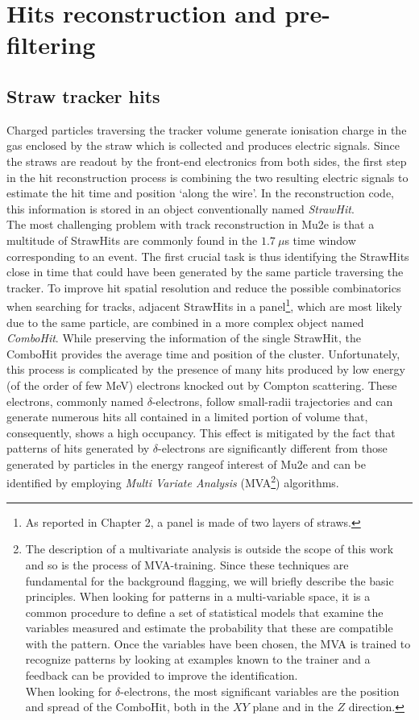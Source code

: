 \documentclass[12pt,a4paper,openright, oneside, titlepage]{book} %
\begin{document}
\section{Hits reconstruction and pre-filtering}
\subsection{Straw tracker hits}
Charged particles traversing the tracker volume generate ionisation charge in the gas enclosed by the straw which is collected and produces electric signals.
Since the straws are readout by the front-end electronics from both sides, 
the first step in the hit reconstruction process is combining the two resulting electric signals 
to estimate the hit time and position `along the wire'. 
In the reconstruction code, this information is stored in an object conventionally named \textit{StrawHit}.\\
The most challenging problem with track reconstruction in Mu2e 
is that a multitude of StrawHits are commonly found
in the  $1.7\ \mu$s time window corresponding to an event.
The first crucial task is thus identifying the StrawHits close in time that could have been generated by the same particle traversing the tracker.
To improve hit spatial resolution and reduce the possible combinatorics when searching for tracks, 
adjacent StrawHits in a panel\footnote{As reported in Chapter 2, a panel is made of two layers of straws.}, 
which are most likely due to the same particle, 
are combined in a more complex object named \textit{ComboHit}. 
While preserving the information of the single StrawHit, the ComboHit provides the average time and position of the cluster. 
Unfortunately, this process is complicated by the presence of many hits produced by low energy (of the order of few MeV) electrons knocked out by Compton scattering. 
These electrons, commonly named $\delta$-electrons, follow small-radii trajectories and can generate numerous hits all contained in a limited portion of volume that, consequently, shows a high occupancy. 
This effect is mitigated by the fact that patterns of hits generated by $\delta$-electrons are significantly different from those generated by particles in the energy rangeof interest of Mu2e and can be identified by employing \textit{Multi Variate Analysis} 
(MVA\footnote{The description of a multivariate analysis is outside the scope of this work and so is the process of MVA-training. Since these techniques are fundamental for the background flagging, we will briefly describe the basic principles.
When looking for patterns in a multi-variable space, it is a common procedure to define a set of statistical models that examine the variables measured and estimate the probability that these are compatible with the pattern. 
Once the variables have been chosen, the MVA is trained to recognize patterns by looking at examples known to the trainer and a feedback can be provided to improve the identification.\\
When looking for $\delta$-electrons, the most significant variables are the position and spread of the ComboHit, both in the $XY$ plane and in the $Z$ direction.}) algorithms.\\
\end{document}

